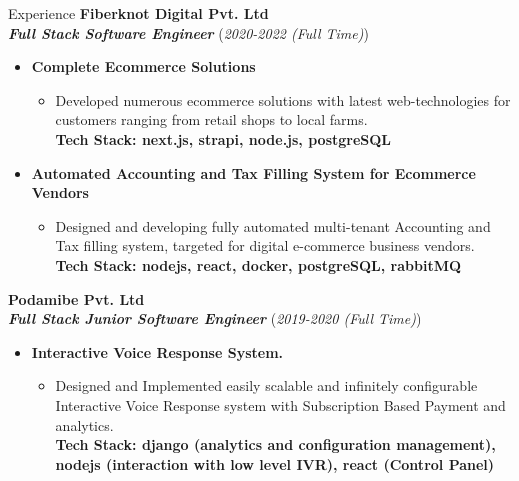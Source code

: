 \documentclass{resume} %
\begin{document}
\begin{rSection}{Experience}
    \large{{\bf Fiberknot Digital Pvt. Ltd}}
    \\ \small{\textit{\textbf{Full Stack Software Engineer}}} (\small{\textit{2020-2022 (Full Time)}})

    \begin{itemize}
        \item \textbf{Complete Ecommerce Solutions}
              \begin{itemize}
                  \item Developed numerous ecommerce solutions with latest web-technologies for customers ranging from retail shops to local farms.
                        \\ \footnotesize{\textbf{Tech Stack: next.js, strapi, node.js, postgreSQL }}
              \end{itemize}
    \end{itemize}

    \begin{itemize}
        \item \textbf{Automated Accounting and Tax Filling System for Ecommerce Vendors}
              \begin{itemize}
                  \item Designed and developing fully automated multi-tenant Accounting and Tax filling system,
                        targeted for digital e-commerce business vendors.
                        \\ \footnotesize{\textbf{Tech Stack: nodejs, react, docker, postgreSQL, rabbitMQ }}
              \end{itemize}
    \end{itemize}

    \large{{\bf Podamibe Pvt. Ltd}}
    \\ \small{\textit{\textbf{Full Stack Junior Software Engineer}}} (\small{\textit{2019-2020 (Full Time)}})

    \begin{itemize}
        \item \textbf{Interactive Voice Response System.}
              \begin{itemize}
                  \item Designed and Implemented easily scalable and infinitely configurable Interactive Voice Response system
                        with Subscription Based Payment and analytics.
                        \\ \footnotesize{\textbf{Tech Stack: django (analytics and configuration management), nodejs (interaction with low level IVR), react (Control Panel)}}
              \end{itemize}


\end{itemize}
\end{rSection}
\end{document}
